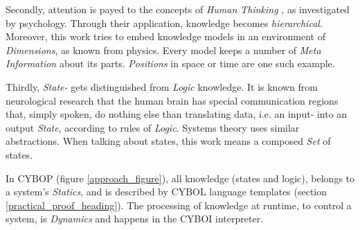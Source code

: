 Secondly, attention is payed to the concepts of \emph{Human Thinking}
\cite{heller2004}, as investigated by psychology. Through their application,
knowledge becomes \emph{hierarchical}. Moreover, this work tries to embed
knowledge models in an environment of \emph{Dimensions}, as known from physics.
Every model keeps a number of \emph{Meta Information} about its parts.
\emph{Positions} in space or time are one such example.

Thirdly, \emph{State-} gets distinguished from \emph{Logic} knowledge. It is
known from neurological research that the human brain has special communication
regions that, simply spoken, do nothing else than translating data, i.e. an
input- into an output \emph{State}, according to rules of \emph{Logic}. Systems
theory uses similar abstractions. When talking about states, this work means a
composed \emph{Set} of states.

In CYBOP (figure \ref{approach_figure}), all knowledge (states and logic),
belongs to a system's \emph{Statics}, and is described by CYBOL language
templates (section \ref{practical_proof_heading}). The processing of knowledge
at runtime, to control a system, is \emph{Dynamics} and happens in the CYBOI
interpreter.
